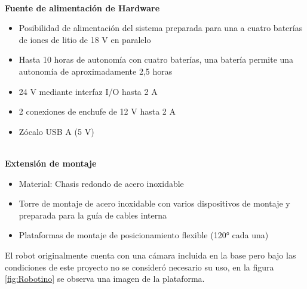             \phantom{saltodelineaforzado >:D}\\
            
            \textbf{Fuente de alimentación de Hardware}
            \begin{itemize}
                \item Posibilidad de alimentación del sistema preparada para una a cuatro baterías de iones de litio de 18 V en paralelo
                \item Hasta 10 horas de autonomía con cuatro baterías, una batería permite una autonomía de aproximadamente 2,5 horas
                \item 24 V mediante interfaz I/O hasta 2 A
                \item 2 conexiones de enchufe de 12 V hasta 2 A
                \item Zócalo USB A (5 V)
            \end{itemize}

            \phantom{saltodelineaforzado >:D}\\
            
            \textbf{Extensión de montaje}
            \begin{itemize}
                \item Material: Chasis redondo de acero inoxidable
                \item Torre de montaje de acero inoxidable con varios dispositivos de montaje y preparada para la guía de cables interna
                \item Plataformas de montaje de posicionamiento flexible (120° cada una)
            \end{itemize}

            El robot originalmente cuenta con una cámara incluida en la base pero bajo las condiciones de este proyecto no se consideró necesario su uso, en la figura \ref{fig:Robotino} se observa una imagen de la plataforma.

